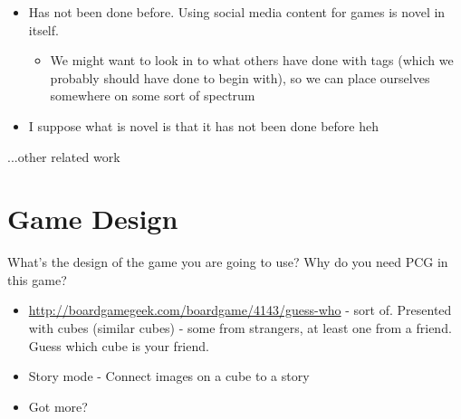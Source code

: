 \documentclass[]{article}
\begin{document}
\begin{itemize}
\item Has not been done before. Using social media content for games is novel in itself.
	\begin{itemize}
	\item We might want to look in to what others have done with tags (which we probably should have done to begin with), so we can place ourselves somewhere on some sort of spectrum
	\end{itemize}
\item I suppose what is novel is that it has not been done before heh
\end{itemize}

...other related work



\section{Game Design}
\label{sec:GameDesign}
\begin{framed}
What’s the design of the game you are going to use? Why do you need PCG in this game?
\end{framed}
\begin{itemize}
\item \href{Guess who}{http://boardgamegeek.com/boardgame/4143/guess-who} - sort of. Presented with cubes (similar cubes) - some from strangers, at least one from a friend. Guess which cube is your friend.
\item Story mode - Connect images on a cube to a story
\item Got more?
\end{itemize}

\end{document}
